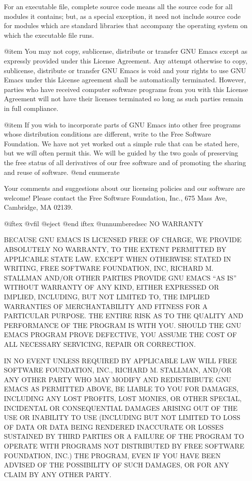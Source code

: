 For an executable file, complete source code means all the source code
for all modules it contains; but, as a special exception, it need not
include source code for modules which are standard libraries that
accompany the operating system on which the executable file runs.

@item
You may not copy, sublicense, distribute or transfer GNU Emacs except
as expressly provided under this License Agreement.  Any attempt
otherwise to copy, sublicense, distribute or transfer GNU Emacs is
void and your rights to use GNU Emacs under this License agreement
shall be automatically terminated.  However, parties who have received
computer software programs from you with this License Agreement will
not have their licenses terminated so long as such parties remain in
full compliance.

@item
If you wish to incorporate parts of GNU Emacs into other free programs
whose distribution conditions are different, write to the Free Software
Foundation.  We have not yet worked out a simple rule that can be stated
here, but we will often permit this.  We will be guided by the two goals of
preserving the free status of all derivatives of our free software and of
promoting the sharing and reuse of software.
@end enumerate

Your comments and suggestions about our licensing policies and our
software are welcome!  Please contact the Free Software Foundation, Inc.,
675 Mass Ave, Cambridge, MA 02139.

@iftex
@vfil
@eject
@end iftex
@unnumberedsec NO WARRANTY

  BECAUSE GNU EMACS IS LICENSED FREE OF CHARGE, WE PROVIDE ABSOLUTELY
NO WARRANTY, TO THE EXTENT PERMITTED BY APPLICABLE STATE LAW.  EXCEPT
WHEN OTHERWISE STATED IN WRITING, FREE SOFTWARE FOUNDATION, INC,
RICHARD M. STALLMAN AND/OR OTHER PARTIES PROVIDE GNU EMACS ``AS IS''
WITHOUT WARRANTY OF ANY KIND, EITHER EXPRESSED OR IMPLIED, INCLUDING,
BUT NOT LIMITED TO, THE IMPLIED WARRANTIES OF MERCHANTABILITY AND
FITNESS FOR A PARTICULAR PURPOSE.  THE ENTIRE RISK AS TO THE QUALITY
AND PERFORMANCE OF THE PROGRAM IS WITH YOU.  SHOULD THE GNU EMACS
PROGRAM PROVE DEFECTIVE, YOU ASSUME THE COST OF ALL NECESSARY
SERVICING, REPAIR OR CORRECTION.

 IN NO EVENT UNLESS REQUIRED BY APPLICABLE LAW WILL FREE SOFTWARE
FOUNDATION, INC., RICHARD M. STALLMAN, AND/OR ANY OTHER PARTY WHO MAY
MODIFY AND REDISTRIBUTE GNU EMACS AS PERMITTED ABOVE, BE LIABLE TO YOU
FOR DAMAGES, INCLUDING ANY LOST PROFITS, LOST MONIES, OR OTHER
SPECIAL, INCIDENTAL OR CONSEQUENTIAL DAMAGES ARISING OUT OF THE USE OR
INABILITY TO USE (INCLUDING BUT NOT LIMITED TO LOSS OF DATA OR DATA
BEING RENDERED INACCURATE OR LOSSES SUSTAINED BY THIRD PARTIES OR A
FAILURE OF THE PROGRAM TO OPERATE WITH PROGRAMS NOT DISTRIBUTED BY
FREE SOFTWARE FOUNDATION, INC.) THE PROGRAM, EVEN IF YOU HAVE BEEN
ADVISED OF THE POSSIBILITY OF SUCH DAMAGES, OR FOR ANY CLAIM BY ANY
OTHER PARTY.

